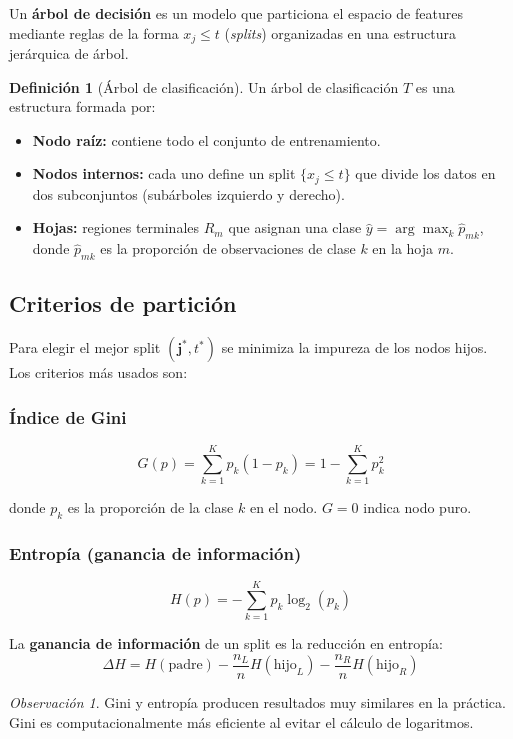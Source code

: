 \documentclass[12pt, a4paper]{article}
\theoremstyle{definition}
\newtheorem{definicion}{Definición}[section]
\theoremstyle{plain}
\theoremstyle{remark}
\newtheorem{observacion}{Observación}[section]
\begin{document}
Un \textbf{árbol de decisión} es un modelo que particiona el espacio de features mediante reglas de la forma $x_j \leq t$ (\textit{splits}) organizadas en una estructura jerárquica de árbol.

\begin{definicion}[Árbol de clasificación]
  Un árbol de clasificación $T$ es una estructura formada por:
  \begin{itemize}
    \item \textbf{Nodo raíz:} contiene todo el conjunto de entrenamiento.
    \item \textbf{Nodos internos:} cada uno define un split $\{x_j \leq t\}$ que divide los datos en dos subconjuntos (subárboles izquierdo y derecho).
    \item \textbf{Hojas:} regiones terminales $R_m$ que asignan una clase $\hat{y} = \arg\max_k \hat{p}_{mk}$, donde $\hat{p}_{mk}$ es la proporción de observaciones de clase $k$ en la hoja $m$.
  \end{itemize}
\end{definicion}

\subsection{Criterios de partición}

Para elegir el mejor split $(\bm{j}^*, t^*)$ se minimiza la impureza de los nodos hijos. Los criterios más usados son:

\subsubsection{Índice de Gini}

\[
  G(p) = \sum_{k=1}^{K} p_k(1 - p_k) = 1 - \sum_{k=1}^{K} p_k^2
\]

donde $p_k$ es la proporción de la clase $k$ en el nodo. $G = 0$ indica nodo puro.

\subsubsection{Entropía (ganancia de información)}

\[
  H(p) = -\sum_{k=1}^{K} p_k \log_2(p_k)
\]

La \textbf{ganancia de información} de un split es la reducción en entropía:
\[
  \Delta H = H(\text{padre}) - \frac{n_L}{n} H(\text{hijo}_L) - \frac{n_R}{n} H(\text{hijo}_R)
\]

\begin{observacion}
  Gini y entropía producen resultados muy similares en la práctica. Gini es computacionalmente más eficiente al evitar el cálculo de logaritmos.
\end{observacion}
\end{document}
